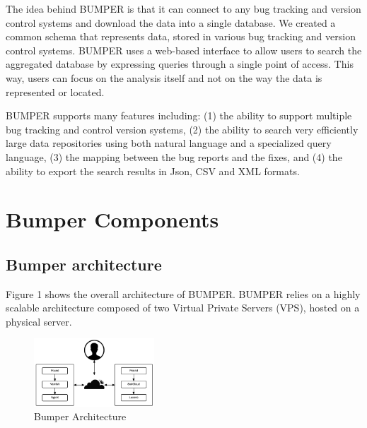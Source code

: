 \documentclass[conference]{IEEEtran}
\begin{document}
The idea behind BUMPER is that it can connect to any bug tracking and version control systems and download the data into a single database. We created a common schema that represents data, stored in various bug tracking and version control systems.
BUMPER uses a web-based interface to allow users to search the aggregated database by expressing queries through a single point of access.
This way, users can focus on the analysis itself and not on the way the data is represented or located.

BUMPER supports many features including: (1) the ability to support multiple bug tracking and control version systems, (2) the ability to search very efficiently large data repositories using both natural language and a specialized query language, (3) the mapping between the bug reports and the fixes, and (4) the ability to export the search results in Json, CSV and XML formats.

\section{Bumper Components}
\label{sec:Bumper Components}

\subsection{Bumper architecture}
\label{sub:Bumper architecture}

Figure 1 shows the overall architecture of BUMPER. BUMPER relies on a highly scalable architecture composed of two Virtual Private Servers (VPS), hosted on a physical server.

\begin{figure}
  \centering
  \includegraphics[width=0.4\textwidth]{media/archi.png}
  \caption{Bumper Architecture}
\vspace{-1.8em}
\end{figure}
\end{document}
